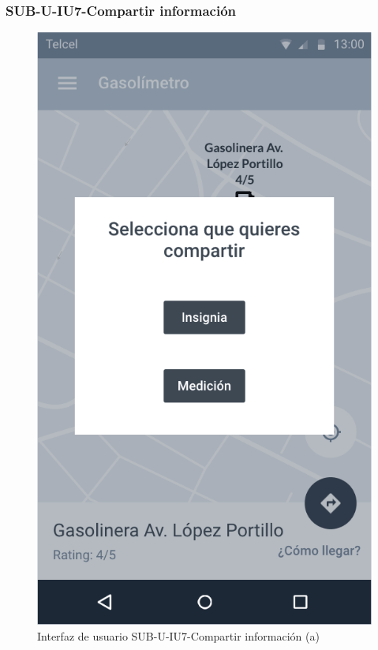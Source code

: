 \subsubsection{SUB-U-IU7-Compartir información}\label{SUB-U-IU7}
\begin{figure}[H]
	\centering
	\includegraphics[scale=.55]{Capitulo4/software/submodulos/usuarios/images/sub-u-iu7_a}
	\caption{Interfaz de usuario SUB-U-IU7-Compartir información (a)}
	\label{fig:sub-u-iu7}
\end{figure}
